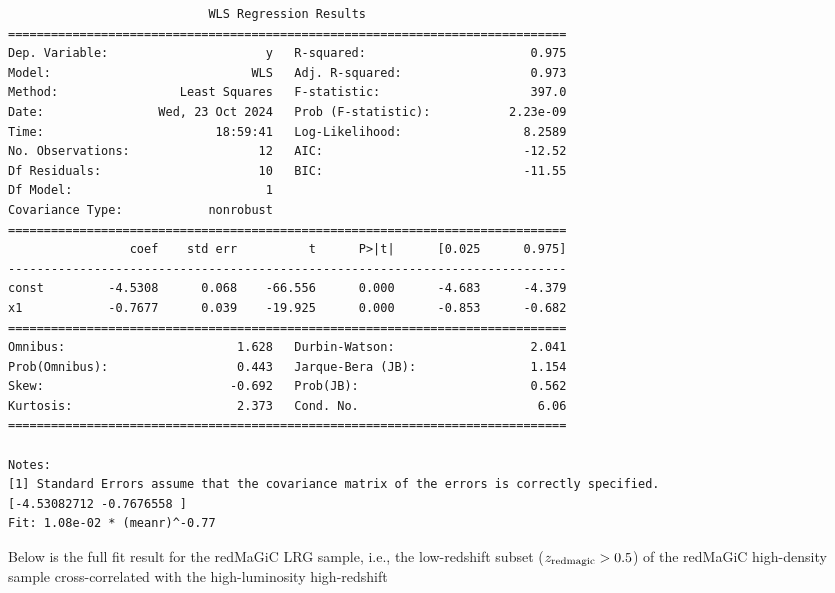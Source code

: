 \documentclass[11pt, oneside]{article}   	%
\begin{document}
\small 
\begin{verbatim}
                            WLS Regression Results                            
==============================================================================
Dep. Variable:                      y   R-squared:                       0.975
Model:                            WLS   Adj. R-squared:                  0.973
Method:                 Least Squares   F-statistic:                     397.0
Date:                Wed, 23 Oct 2024   Prob (F-statistic):           2.23e-09
Time:                        18:59:41   Log-Likelihood:                 8.2589
No. Observations:                  12   AIC:                            -12.52
Df Residuals:                      10   BIC:                            -11.55
Df Model:                           1                                         
Covariance Type:            nonrobust                                         
==============================================================================
                 coef    std err          t      P>|t|      [0.025      0.975]
------------------------------------------------------------------------------
const         -4.5308      0.068    -66.556      0.000      -4.683      -4.379
x1            -0.7677      0.039    -19.925      0.000      -0.853      -0.682
==============================================================================
Omnibus:                        1.628   Durbin-Watson:                   2.041
Prob(Omnibus):                  0.443   Jarque-Bera (JB):                1.154
Skew:                          -0.692   Prob(JB):                        0.562
Kurtosis:                       2.373   Cond. No.                         6.06
==============================================================================

Notes:
[1] Standard Errors assume that the covariance matrix of the errors is correctly specified.
[-4.53082712 -0.7676558 ]
Fit: 1.08e-02 * (meanr)^-0.77
\end{verbatim}
\normalsize

Below is the full fit result for the redMaGiC LRG sample, i.e., the low-redshift subset ($z_{\rm redmagic} > 0.5$) of the redMaGiC high-density sample cross-correlated with the high-luminosity high-redshift 
\end{document}
